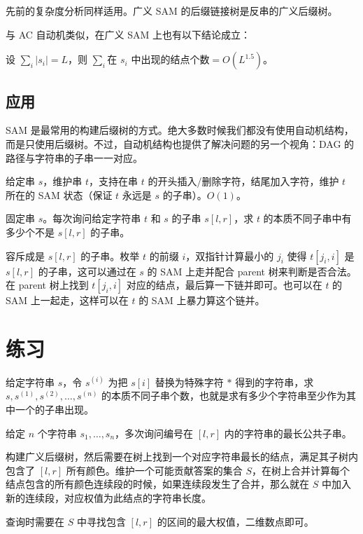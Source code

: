 先前的复杂度分析同样适用。广义 SAM 的后缀链接树是反串的广义后缀树。

与 AC 自动机类似，在广义 SAM 上也有以下结论成立：
\begin{property}
    设 $\sum_i |s_i|=L$，则 $\sum_i \text{在 }s_i\text{ 中出现的结点个数}=O(L^{1.5})$。
\end{property}

\subsection{应用}

SAM 是最常用的构建后缀树的方式。绝大多数时候我们都没有使用自动机结构，而是只使用后缀树。不过，自动机结构也提供了解决问题的另一个视角：DAG 的路径与字符串的子串一一对应。

\begin{exercise}
    给定串 $s$，维护串 $t$，支持在串 $t$ 的开头插入/删除字符，结尾加入字符，维护 $t$ 所在的 SAM 状态（保证 $t$ 永远是 $s$ 的子串）。$O(1)$。
\end{exercise}



\begin{exercise}[{[NOI2018] 你的名字}]
    固定串 $s$。每次询问给定字符串 $t$ 和 $s$ 的子串 $s[l,r]$，求 $t$ 的本质不同子串中有多少个不是 $s[l,r]$ 的子串。
\end{exercise}
\begin{solution}
    容斥成是 $s[l,r]$ 的子串。枚举 $t$ 的前缀 $i$，双指针计算最小的 $j_i$ 使得 $t[j_i,i]$ 是 $s[l,r]$ 的子串，这可以通过在 $s$ 的 SAM 上走并配合 parent 树来判断是否合法。在 parent 树上找到 $t[j_i,i]$ 对应的结点，最后算一下链并即可。也可以在 $t$ 的 SAM 上一起走，这样可以在 $t$ 的 SAM 上暴力算这个链并。
\end{solution}


\section{练习}

\begin{exercise}[CF1276F]
    给定字符串 $s$，令 $s^{(i)}$ 为把 $s[i]$ 替换为特殊字符 $*$ 得到的字符串，求 $s,s^{(1)},s^{(2)},\ldots,s^{(n)}$ 的本质不同子串个数，也就是求有多少个字符串至少作为其中一个的子串出现。
\end{exercise}

\begin{exercise}[{P5576 [CmdOI2019] 口头禅}]
    给定 $n$ 个字符串 $s_1,\ldots,s_n$，多次询问编号在 $[l,r]$ 内的字符串的最长公共子串。
\end{exercise}
\begin{solution}
    构建广义后缀树，然后需要在树上找到一个对应字符串最长的结点，满足其子树内包含了 $[l,r]$ 所有颜色。维护一个可能贡献答案的集合 $S$，在树上合并计算每个结点包含的所有颜色连续段的时候，如果连续段发生了合并，那么就在 $S$ 中加入新的连续段，对应权值为此结点的字符串长度。

    查询时需要在 $S$ 中寻找包含 $[l,r]$ 的区间的最大权值，二维数点即可。
\end{solution}






